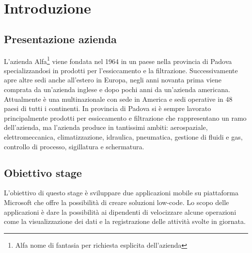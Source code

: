 \chapter{Introduzione}
\section{Presentazione azienda}
L'azienda Alfa\footnote{Alfa nome di fantasia  per richiesta esplicita dell'azienda} viene fondata nel 1964 in un paese nella provincia di Padova specializzandosi in prodotti per l'essiccamento e la filtrazione.
Successivamente apre altre sedi anche all'estero in Europa, negli anni novanta prima viene comprata da un'azienda inglese e dopo pochi anni da un'azienda americana.
Attualmente è una multinazionale con sede in America e sedi operative in 48 paesi di tutti i continenti. 
In provincia di Padova si è sempre lavorato principalmente prodotti per essiccamento e filtrazione che rappresentano un ramo dell’azienda, ma l’azienda produce in tantissimi ambiti: aerospaziale, elettromeccanica, climatizzazione, idraulica, pneumatica, gestione di fluidi e gas, controllo di processo, sigillatura e schermatura.
\section{Obiettivo stage}
L'obiettivo di questo stage è sviluppare due applicazioni mobile su piattaforma Microsoft che offre la possibilità di creare soluzioni low-code.
Lo scopo delle applicazioni è dare la possibilità ai dipendenti di velocizzare alcune operazioni come la visualizzazione dei dati e la registrazione delle attività svolte in giornata.

